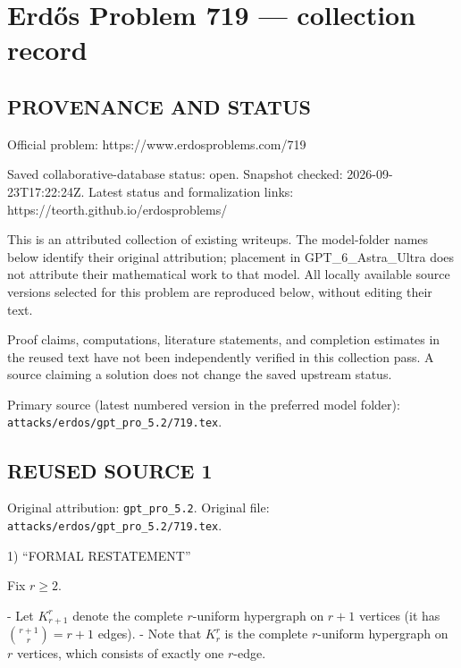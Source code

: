\section*{Erd\H{o}s Problem 719 --- collection record}

\subsection*{PROVENANCE AND STATUS}
Official problem: https://www.erdosproblems.com/719

Saved collaborative-database status: open.
Snapshot checked: 2026-09-23T17:22:24Z.
Latest status and formalization links: https://teorth.github.io/erdosproblems/

This is an attributed collection of existing writeups. The model-folder names below identify their original attribution; placement in GPT\_6\_Astra\_Ultra does not attribute their mathematical work to that model. All locally available source versions selected for this problem are reproduced below, without editing their text.

Proof claims, computations, literature statements, and completion estimates in the reused text have not been independently verified in this collection pass. A source claiming a solution does not change the saved upstream status.

Primary source (latest numbered version in the preferred model folder): \texttt{attacks/erdos/gpt\_pro\_5.2/719.tex}.

\subsection*{REUSED SOURCE 1}
Original attribution: \texttt{gpt\_pro\_5.2}.
Original file: \texttt{attacks/erdos/gpt\_pro\_5.2/719.tex}.


1) “FORMAL RESTATEMENT”

Fix $r\ge 2$.

- Let $K_{r+1}^r$ denote the complete $r$-uniform hypergraph on $r+1$ vertices (it has $\binom{r+1}{r}=r+1$ edges).
- Note that $K_r^r$ is the complete $r$-uniform hypergraph on $r$ vertices, which consists of exactly one $r$-edge.

